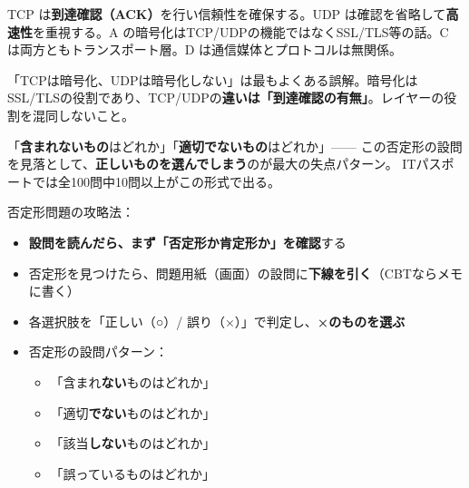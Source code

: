 
\begin{kaisetsu}
TCP は\textbf{到達確認（ACK）}を行い信頼性を確保する。UDP は確認を省略して\textbf{高速性}を重視する。A の暗号化はTCP/UDPの機能ではなくSSL/TLS等の話。C は両方ともトランスポート層。D は通信媒体とプロトコルは無関係。
\end{kaisetsu}

\begin{trickwarn}
「TCPは暗号化、UDPは暗号化しない」は最もよくある誤解。暗号化はSSL/TLSの役割であり、TCP/UDPの\textbf{違いは「到達確認の有無」}。レイヤーの役割を混同しないこと。
\end{trickwarn}



\mondaipage
{}

\begin{stumble}
「\textbf{含まれないもの}はどれか」「\textbf{適切でないもの}はどれか」——
この否定形の設問を見落として、\textbf{正しいものを選んでしまう}のが最大の失点パターン。
ITパスポートでは全100問中10問以上がこの形式で出る。
\end{stumble}

\begin{keypoint}
否定形問題の攻略法：
\begin{itemize}
  \item \textbf{設問を読んだら、まず「否定形か肯定形か」を確認}する
  \item 否定形を見つけたら、問題用紙（画面）の設問に\textbf{下線を引く}（CBTならメモに書く）
  \item 各選択肢を「正しい（○）/ 誤り（×）」で判定し、\textbf{×のものを選ぶ}
  \item 否定形の設問パターン：
    \begin{itemize}
      \item 「含まれ\textbf{ない}ものはどれか」
      \item 「適切\textbf{でない}ものはどれか」
      \item 「該当\textbf{しない}ものはどれか」
      \item 「誤っているものはどれか」
    \end{itemize}
\end{itemize}
\end{keypoint}

